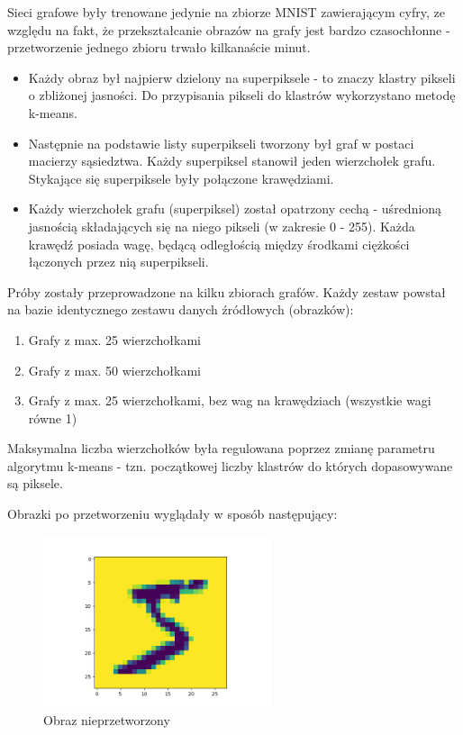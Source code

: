\documentclass{article}
\begin{document}
Sieci grafowe były trenowane jedynie na zbiorze MNIST zawierającym cyfry, 
ze względu na fakt, że przekształcanie obrazów na grafy jest bardzo czasochłonne - 
przetworzenie jednego zbioru trwało kilkanaście minut.

\begin{itemize}
    \item Każdy obraz był najpierw dzielony na superpiksele - to znaczy klastry pikseli o 
    zbliżonej jasności. Do przypisania pikseli do klastrów wykorzystano metodę k-means.
    \item Następnie na podstawie listy superpikseli tworzony był graf w postaci macierzy
    sąsiedztwa. Każdy superpiksel stanowił jeden wierzchołek grafu. Stykające się superpiksele
    były połączone krawędziami.
    \item Każdy wierzchołek grafu (superpiksel) został opatrzony cechą -
    uśrednioną jasnością składających się na niego pikseli (w zakresie 0 - 255).
    Każda krawędź posiada wagę, będącą odległością między środkami ciężkości
    łączonych przez nią superpikseli.
\end{itemize}

Próby zostały przeprowadzone na kilku zbiorach grafów. Każdy zestaw powstał na bazie 
identycznego zestawu danych źródłowych (obrazków): 

\begin{enumerate}[label=(\textbf{\Alph*})]
    \item Grafy z max. 25 wierzchołkami
    \item Grafy z max. 50 wierzchołkami
    \item Grafy z max. 25 wierzchołkami, bez wag na krawędziach (wszystkie wagi równe 1)
\end{enumerate}

Maksymalna liczba wierzchołków była regulowana poprzez zmianę parametru algorytmu k-means - tzn. 
początkowej liczby klastrów do których dopasowywane są piksele.

Obrazki po przetworzeniu wyglądały w sposób następujący:
\begin{figure}[H]
    \centering
    \includegraphics[width=0.6\textwidth]{img/5Raw.png}
    \caption{Obraz nieprzetworzony} 
\end{figure}
\end{document}
